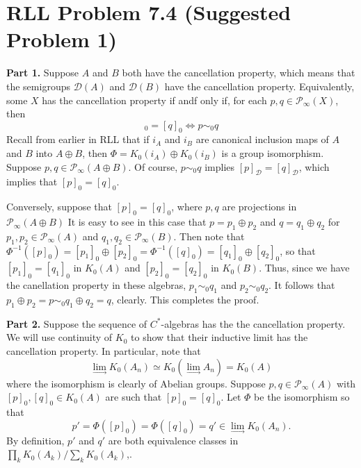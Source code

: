 \documentclass[aps,pra,showpacs,notitlepage,onecolumn,superscriptaddress,nofootinbib]{revtex4-1}
\theoremstyle{definition}
\newtheorem{theorem}{Theorem}[section]
\begin{document}
\begin{comment}
\section{Main result}

\noindent With our preliminary lemmas, we can now attempt to prove the main result.

\begin{theorem}

\end{theorem}
\end{comment}

\section{RLL Problem 7.4 (Suggested Problem 1)}

\noindent \textbf{Part 1.} Suppose $A$ and $B$ both have the cancellation property, which means that the semigroups $\mathcal{D}(A)$ and $\mathcal{D}(B)$ have the cancellation property.
Equivalently, some $X$ has the cancellation property if andf only if, for each $p, q \in \mathcal{P}_{\infty}(X)$, then
\begin{equation}
  [p]_0 = [q]_0 \Longleftrightarrow p \sim_0 q
\end{equation}
Recall from earlier in RLL that if $i_A$ and $i_B$ are canonical inclusion maps of $A$ and $B$ into $A \oplus B$, then $\Phi = K_0(i_A) \oplus K_0(i_B)$ is a group isomorphism.
Suppose $p, q \in \mathcal{P}_{\infty}(A \oplus B)$. Of course, $p \sim_0 q$ implies $[p]_{\mathcal{D}} = [q]_{\mathcal{D}}$, which implies that $[p]_{0} = [q]_{0}$.

Conversely, suppose
that $[p]_0 = [q]_0$, where $p, q$ are projections in $\mathcal{P}_{\infty}(A \oplus B)$ It is easy to see in this case that $p = p_1 \oplus p_2$ and $q = q_1 \oplus q_2$ for $p_1, p_2 \in \mathcal{P}_{\infty}(A)$ and $q_1, q_2 \in \mathcal{P}_{\infty}(B)$.
Then note that $\Phi^{-1}([p]_0) = [p_1]_0 \oplus [p_2]_0 = \Phi^{-1}([q]_0) = [q_1]_0 \oplus [q_2]_0$, so that $[p_1]_0 = [q_1]_0$ in $K_0(A)$ and $[p_2]_0 = [q_2]_0$ in $K_0(B)$. Thus, since
we have the canellation property in these algebras, $p_1 \sim_0 q_1$ and $p_2 \sim_0 q_2$. It follows that $p_1 \oplus p_2 = p \sim_0 q_1 \oplus q_2 = q$, clearly. This completes the proof.
\newline

\noindent \textbf{Part 2.} Suppose the sequence of $C^{*}$-algebras has the the cancellation property. We will use continuity of $K_0$ to show that their inductive limit has the cancellation property.
In particular, note that
\begin{equation}
  \lim_{\longrightarrow} K_0(A_n) \simeq K_0(\lim_{\longrightarrow} A_n) = K_0(A)
\end{equation}
where the isomorphism is clearly of Abelian groups. Suppose $p, q \in \mathcal{P}_{\infty}(A)$ with $[p]_0, [q]_0 \in K_0(A)$ are such that $[p]_0 = [q]_0$. Let $\Phi$ be
the isomorphism so that
$$p' = \Phi([p]_0) = \Phi([q]_0) = q' \in \lim_{\longrightarrow} K_0(A_n).$$
By definition, $p'$ and $q'$ are both equivalence classes in $\prod_{k} K_0(A_k) \Big/ \sum_{k} K_0(A_k)$,.
\newline
\end{document}

